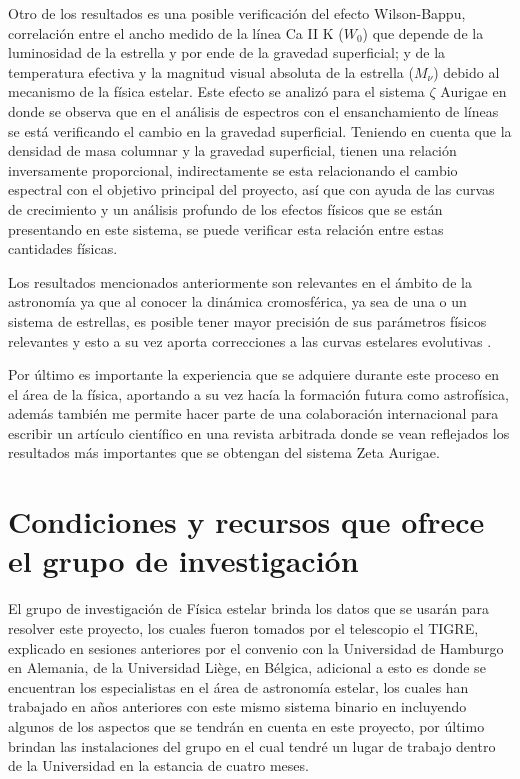 \documentclass[11pt]{article}
\begin{document}
Otro de los resultados es una posible verificación del efecto Wilson-Bappu, correlación entre el ancho medido de la línea Ca II K ($W_0$) que depende de la luminosidad de la estrella y por ende de la gravedad superficial; y de la temperatura efectiva y la magnitud visual absoluta de la estrella ($M_{\nu}$) debido al mecanismo de la física estelar. Este efecto se analizó para el sistema $\zeta$ Aurigae en \cite{Dani} donde se observa que en el análisis de espectros con el ensanchamiento de líneas se está verificando el cambio en la gravedad superficial. Teniendo en cuenta que la densidad de masa columnar y la gravedad superficial, tienen una relación inversamente proporcional, indirectamente se esta relacionando el cambio espectral con el objetivo principal del proyecto, así que con ayuda de las curvas de crecimiento y un análisis profundo de los efectos físicos que se están presentando en este sistema, se puede verificar esta relación entre estas cantidades físicas.

\noindent Los resultados mencionados anteriormente son relevantes en el ámbito de la astronomía ya que al conocer la dinámica cromosférica, ya sea de una o un sistema de estrellas, es posible tener mayor precisión de sus parámetros físicos relevantes y esto a su vez aporta correcciones a las curvas estelares evolutivas \cite{pols1998stellar}.  

Por último es importante la experiencia que se adquiere durante este proceso en el área de la física, aportando a su vez hacía la formación futura como astrofísica, además también me permite hacer parte de una colaboración internacional para escribir un artículo científico en una revista arbitrada donde se vean reflejados los resultados más importantes que se obtengan del sistema Zeta Aurigae.




\section{Condiciones y recursos que ofrece el grupo de investigación}

El grupo de investigación de Física estelar brinda los datos que se usarán para resolver este proyecto, los cuales fueron tomados por el telescopio el TIGRE, explicado en sesiones anteriores por el convenio con la Universidad de Hamburgo en Alemania, de la Universidad Liège, en Bélgica, adicional a esto es donde se encuentran los especialistas en el área de astronomía estelar, los cuales han trabajado en años anteriores con este mismo sistema binario en incluyendo algunos de los aspectos que se tendrán en cuenta en este proyecto, por último brindan las instalaciones del grupo en el cual tendré un lugar de trabajo dentro de la Universidad en la estancia de cuatro meses.
\vspace{45mm}
\end{document}
